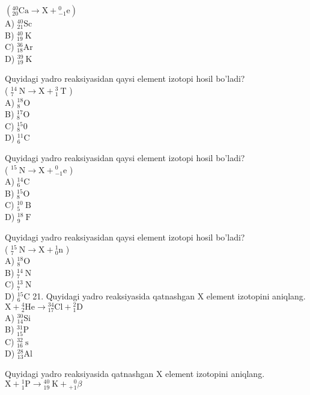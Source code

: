 $\left({ }_{20}^{40} \mathrm{Ca} \rightarrow \mathrm{X}+{ }_{-1}^{0} \mathrm{e}\right)$\\
A) ${ }_{21}^{40} \mathrm{Sc}$\\
B) ${ }_{19}^{40} \mathrm{~K}$\\
C) ${ }_{18}^{36} \mathrm{Ar}$\\
D) ${ }_{19}^{39} \mathrm{~K}$
  \item Quyidagi yadro reaksiyasidan qaysi element izotopi hosil bo'ladi?\\
( ${ }_{7}^{14} \mathrm{~N} \rightarrow \mathrm{X}+{ }_{1}^{3} \mathrm{~T}$ )\\
A) ${ }_{8}^{18} \mathrm{O}$\\
B) ${ }_{8}^{17} \mathrm{O}$\\
C) ${ }_{8}^{15} 0$\\
D) ${ }_{6}^{11} \mathrm{C}$
  \item Quyidagi yadro reaksiyasidan qaysi element izotopi hosil bo'ladi?\\
( ${ }^{15} \mathrm{~N} \rightarrow \mathrm{X}+{ }_{-1}^{0} \mathrm{e}$ )\\
A) ${ }_{6}^{14} \mathrm{C}$\\
B) ${ }_{8}^{15} \mathrm{O}$\\
C) ${ }_{5}^{10} \mathrm{~B}$\\
D) ${ }_{9}^{18} \mathrm{~F}$
  \item Quyidagi yadro reaksiyasidan qaysi element izotopi hosil bo'ladi?\\
( ${ }_{7}^{15} \mathrm{~N} \rightarrow \mathrm{X}+{ }_{0}^{1} \mathrm{n}$ )\\
A) ${ }_{8}^{18} \mathrm{O}$\\
B) ${ }_{7}^{14} \mathrm{~N}$\\
C) ${ }_{7}^{13} \mathrm{~N}$\\
D) ${ }_{6}^{15} \mathrm{C}$
21. Quyidagi yadro reaksiyasida qatnashgan X element izotopini aniqlang. $\mathrm{X}+{ }_{2}^{4} \mathrm{He} \rightarrow{ }_{17}^{34} \mathrm{Cl}+{ }_{1}^{2} \mathrm{D}$\\
A) ${ }_{14}^{30} \mathrm{Si}$\\
B) ${ }_{15}^{31} \mathrm{P}$\\
C) ${ }_{16}^{32} \mathrm{~s}$\\
D) ${ }_{13}^{28} \mathrm{Al}$
  \item Quyidagi yadro reaksiyasida qatnashgan X element izotopini aniqlang. $\mathrm{X}+{ }_{1}^{1} \mathrm{P} \rightarrow{ }_{19}^{40} \mathrm{~K}+{ }_{+}{ }_{1}^{0} \beta$\\
